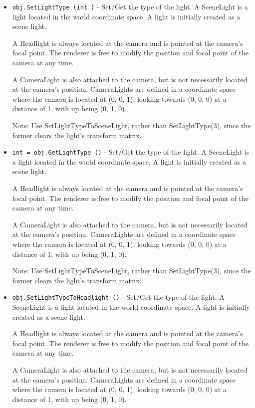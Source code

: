 \begin{itemize}
\item  \verb|obj.SetLightType (int )| -  Set/Get the type of the light.
 A SceneLight is a light located in the world coordinate space.  A light
 is initially created as a scene light.

 A Headlight is always located at the camera and is pointed at the 
 camera's focal point.  The renderer is free to modify the position and
 focal point of the camera at any time.

 A CameraLight is also attached to the camera, but is not necessarily
 located at the camera's position.  CameraLights are defined in a 
 coordinate space where the camera is located at (0, 0, 1), looking
 towards (0, 0, 0) at a distance of 1, with up being (0, 1, 0).

 Note: Use SetLightTypeToSceneLight, rather than SetLightType(3), since
 the former clears the light's transform matrix.

\item  \verb|int = obj.GetLightType ()| -  Set/Get the type of the light.
 A SceneLight is a light located in the world coordinate space.  A light
 is initially created as a scene light.

 A Headlight is always located at the camera and is pointed at the 
 camera's focal point.  The renderer is free to modify the position and
 focal point of the camera at any time.

 A CameraLight is also attached to the camera, but is not necessarily
 located at the camera's position.  CameraLights are defined in a 
 coordinate space where the camera is located at (0, 0, 1), looking
 towards (0, 0, 0) at a distance of 1, with up being (0, 1, 0).

 Note: Use SetLightTypeToSceneLight, rather than SetLightType(3), since
 the former clears the light's transform matrix.

\item  \verb|obj.SetLightTypeToHeadlight ()| -  Set/Get the type of the light.
 A SceneLight is a light located in the world coordinate space.  A light
 is initially created as a scene light.

 A Headlight is always located at the camera and is pointed at the 
 camera's focal point.  The renderer is free to modify the position and
 focal point of the camera at any time.

 A CameraLight is also attached to the camera, but is not necessarily
 located at the camera's position.  CameraLights are defined in a 
 coordinate space where the camera is located at (0, 0, 1), looking
 towards (0, 0, 0) at a distance of 1, with up being (0, 1, 0).


\end{itemize}
